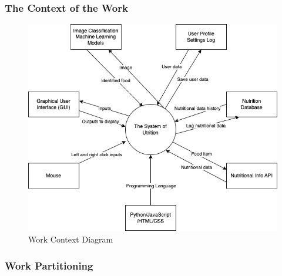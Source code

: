 \documentclass[12pt]{article}
\begin{document}
\subsubsection{The Context of the Work}
\begin{figure}[H]
	\centering
	\includegraphics[scale=0.6]{work_context_diagram.png}
	\caption{Work Context Diagram}
\end{figure}


\subsubsection{Work Partitioning}
\end{document}
